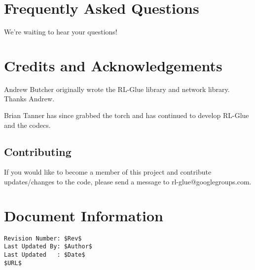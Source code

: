 \documentclass[11pt]{article}
\begin{document}
\section{Frequently Asked Questions}
We're waiting to hear your questions!

\section{Credits and Acknowledgements}
Andrew Butcher originally wrote the RL-Glue library and network library.  Thanks Andrew.

Brian Tanner has since grabbed the torch and has continued to develop RL-Glue and the codecs.

\subsection{Contributing}
If you would like to become a member of this project and contribute updates/changes to the code, please send a message to rl-glue@googlegroups.com.


\section*{Document Information}
\begin{verbatim}
Revision Number: $Rev$
Last Updated By: $Author$
Last Updated   : $Date$
$URL$
\end{verbatim}
\end{document}

